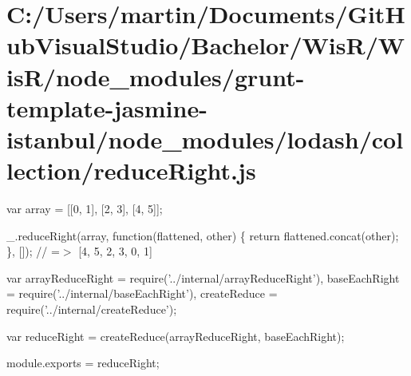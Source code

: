 \hypertarget{_c_1_2_users_2martin_2_documents_2_git_hub_visual_studio_2_bachelor_2_wis_r_2_wis_r_2node_module224f0c38ca83683047fc56c9537d16ed}{}\section{C\+:/\+Users/martin/\+Documents/\+Git\+Hub\+Visual\+Studio/\+Bachelor/\+Wis\+R/\+Wis\+R/node\+\_\+modules/grunt-\/template-\/jasmine-\/istanbul/node\+\_\+modules/lodash/collection/reduce\+Right.\+js}
var array = \mbox{[}\mbox{[}0, 1\mbox{]}, \mbox{[}2, 3\mbox{]}, \mbox{[}4, 5\mbox{]}\mbox{]};

\+\_\+.\+reduce\+Right(array, function(flattened, other) \{ return flattened.\+concat(other); \}, \mbox{[}\mbox{]}); // =$>$ \mbox{[}4, 5, 2, 3, 0, 1\mbox{]}


\begin{DoxyCodeInclude}
var arrayReduceRight = require(\textcolor{stringliteral}{'../internal/arrayReduceRight'}),
    baseEachRight = require(\textcolor{stringliteral}{'../internal/baseEachRight'}),
    createReduce = require(\textcolor{stringliteral}{'../internal/createReduce'});

var reduceRight = createReduce(arrayReduceRight, baseEachRight);

module.exports = reduceRight;
\end{DoxyCodeInclude}
 
